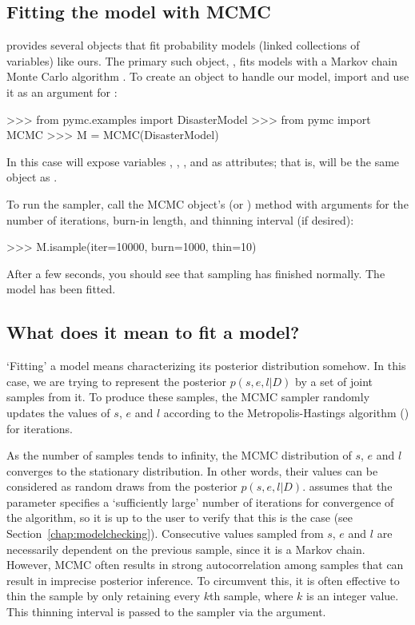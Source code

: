 \documentclass[]{jss}
\begin{document}
\subsection{Fitting the model with MCMC}

 provides several objects that fit probability models (linked collections of variables) like ours. The primary such object, , fits models with a Markov chain Monte Carlo algorithm \citep{Gamerman:1997tb}. To create an  object to handle our model, import  and use it as an argument for :
\begin{CodeInput}
>>> from pymc.examples import DisasterModel
>>> from pymc import MCMC
>>> M = MCMC(DisasterModel)
\end{CodeInput}
In this case  will expose variables , , ,  and  as attributes; that is,  will be the same object as .

To run the sampler, call the MCMC object's  (or ) method with arguments for the number of iterations, burn-in length, and thinning interval (if desired):
\begin{CodeInput}
>>> M.isample(iter=10000, burn=1000, thin=10)
\end{CodeInput}
After a few seconds, you should see that sampling has finished normally. The model has been fitted.

\subsection{What does it mean to fit a model?}

`Fitting' a model means characterizing its posterior distribution somehow. In this case, we are trying to represent the posterior $p(s,e,l|D)$ by a set of joint samples from it. To produce these samples, the MCMC sampler randomly updates the values of $s$, $e$ and $l$ according to the Metropolis-Hastings algorithm (\citet{gelman}) for   iterations.

As the number of samples tends to infinity, the MCMC distribution of $s$, $e$
and $l$ converges to the stationary distribution. In other words, their
values can be considered as random draws from the posterior $p(s,e,l|D)$.
 assumes that the  parameter specifies a `sufficiently large'
number of iterations for convergence of the algorithm, so it is up to the user
to verify
that this is the case (see Section~\ref{chap:modelchecking}). Consecutive values
sampled from $s$, $e$ and $l$ are necessarily dependent on the previous sample,
since it is a Markov chain. However, MCMC often results in strong
autocorrelation among samples that can result in imprecise posterior inference.
To circumvent this, it is often effective to thin the sample by only retaining
every $k$th sample, where $k$ is an integer value. This thinning interval is
passed to the sampler via the  argument.
\end{document}
